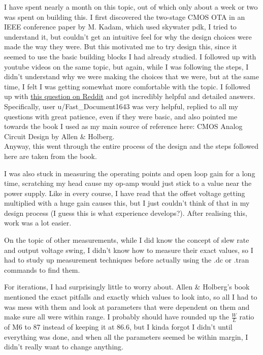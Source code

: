 \documentclass[
]{article}
\begin{document}
I have spent nearly a month on this topic, out of which only about a
week or two was spent on building this. I first discovered the two-stage
CMOS OTA in an IEEE conference paper by M. Kadam, which used skywater
pdk, I tried to understand it, but couldn't get an intuitive feel for
why the design choices were made the way they were. But this motivated
me to try design this, since it seemed to use the basic building blocks
I had already studied. I followed up with youtube videos on the same
topic, but again, while I was following the steps, I didn't understand
why we were making the choices that we were, but at the same time, I
felt I was getting somewhat more comfortable with the topic. I followed
up with
\href{https://www.reddit.com/r/chipdesign/comments/1t0mj9j/how_do_you_actually_design_a_circuit/}{this
question on Reddit} and got incredibly helpful and detailed answers.
Specifically, user u/Fast\_Document1643 was very helpful, replied to all
my questions with great patience, even if they were basic, and also
pointed me towards the book I used as my main source of reference here:
CMOS Analog Circuit Design by Allen \& Holberg.\\
Anyway, this went through the entire process of the design and the steps
followed here are taken from the book.

I was also stuck in measuring the operating points and open loop gain
for a long time, scratching my head cause my op-amp would just stick to
a value near the power supply. Like in every course, I have read that
the offset voltage getting multiplied with a huge gain causes this, but
I just couldn't think of that in my design process (I guess this is what
experience develops?). After realising this, work was a lot easier.

On the topic of other measurements, while I did know the concept of slew
rate and output voltage swing, I didn't know how to measure their exact
values, so I had to study up measurement techniques before actually
using the .dc or .tran commands to find them.

For iterations, I had surprisingly little to worry about. Allen \&
Holberg's book mentioned the exact pitfalls and exactly which values to
look into, so all I had to was mess with them and look at parameters
that were dependent on them and make sure all were within range. I
probably should have rounded up the \(\frac{W}{L}\) ratio of M6 to 87
instead of keeping it at 86.6, but I kinda forgot I didn't until
everything was done, and when all the parameters seemed be within
margin, I didn't really want to change anything.
\end{document}
